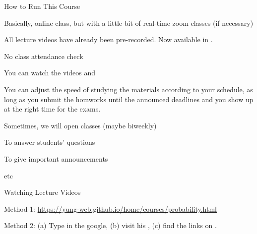 \begin{frame}{How to Run This Course}

\plitemsep 0.07in

  \bci
\item<1-> Basically,  online class, but with a little
  bit of real-time zoom classes (if necessary)


\item<2-> All lecture videos have already been pre-recorded.
  Now available in . 
\bci

\item No class attendance check
\item You can watch the videos  and  
\item You can adjust the speed of studying the materials according to
  your schedule, as long as you submit the homworks until the
  announced deadlines and you show up at the right time for the exams. 
  
  \eci
  
\item<3-> Sometimes, we will open   classes (maybe biweekly)
  \bci
\item To answer students' questions
\item To give important announcements
\item etc
  \eci
  
  \eci

\end{frame}

\begin{frame}{Watching Lecture Videos}

\plitemsep 0.03in

  \bci
\item<1-> Method 1: \url{https://yung-web.github.io/home/courses/probability.html}  

\item<2-> Method 2: (a) Type  in the google, (b) visit his , (c) find the links on . 

{
}
{
}
\eci

\end{frame}

